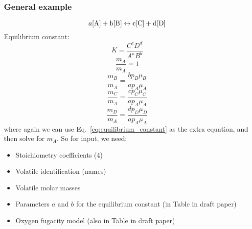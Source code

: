 \subsubsection{General example}
\label{sec:general_reaction}
\begin{equation}
    a[\rm{A}] + b[\rm{B}] \leftrightarrow c[\rm{C}] + d[\rm{D}]
    \label{eq:reaction_general}
\end{equation}
Equilibrium constant:
\begin{equation}
K = \frac{C^c D^d}{A^a B^b}
\label{eq:equilibrium_constant}
\end{equation}
\begin{equation}
\frac{m_{A}}{m_{A}} = 1
\end{equation}
\begin{equation}
\frac{m_{B}}{m_{A}} = \frac{b p_{B} \mu_{B}}{a p_{A} \mu_{A} }
\end{equation}
\begin{equation}
\frac{m_{C}}{m_{A}} = \frac{c p_{C} \mu_{C}}{a p_{A} \mu_{A} }
\end{equation}
\begin{equation}
\frac{m_{D}}{m_{A}} = \frac{d p_{D} \mu_{D}}{a p_{A} \mu_{A} }
\end{equation}
where again we can use Eq.~\ref{eq:equilibrium_constant} as the extra equation, and then solve for $m_A$.  So for input, we need:
\begin{itemize}
\item Stoichiometry coefficients (4)
\item Volatile identification (names)
\item Volatile molar masses
\item Parameters $a$ and $b$ for the equilibrium constant (in Table in draft paper)
\item Oxygen fugacity model (also in Table in draft paper)
\end{itemize}
